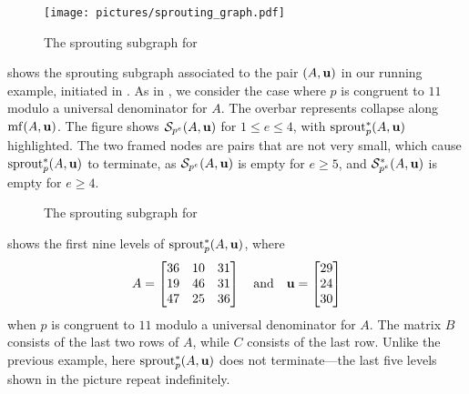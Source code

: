 \documentclass{amsart}
\begin{document}
\begin{example}
   \label{ex: ft.4}
   \begin{figure}
      \centering
      \texttt{[image: pictures/sprouting\_graph.pdf]}
      \caption{The sprouting subgraph for }
      \label{fig: sprouting graph}
   \end{figure}
    shows the sprouting subgraph associated to the pair $(A,\mathbf{u})$ in our running example, initiated in .
   As in , we consider the case where $p$ is congruent to $11$ modulo a universal denominator for $A$.
   The overbar represents collapse along $\operatorname{mf}(A,\mathbf{u})$.
   The figure shows $\mathcal{S}_{p^e}(A,\mathbf{u})$ for $1 \le e \le 4$, with $\operatorname{sprout}^*_p(A,\mathbf{u})$ highlighted.
   The two framed nodes are pairs that are not very small, which cause $\operatorname{sprout}^*_p(A,\mathbf{u})$ to terminate, as $\mathcal{S}_{p^e}(A,\mathbf{u})$ is empty for $e\ge 5$, and $\mathcal{S}_{p^e}^*(A,\mathbf{u})$ is empty for $e\ge 4$.
\end{example}

\begin{example}
   \label{ex: new example}
   \begin{figure}
      \centering
      \caption{The sprouting subgraph for }
      \label{fig: sprouting graph 2}
   \end{figure}
    shows the first nine levels of $\operatorname{sprout}^*_p(A,\mathbf{u})$, where
   \[
      A = \begin{bmatrix} 36&10&31 \\ 19&46&31 \\ 47&25&36 \end{bmatrix}
      \quad\text{and} \quad
      \mathbf{u} =\begin{bmatrix} 29 \\ 24 \\ 30 \end{bmatrix}
   \]
   when $p$ is congruent to $11$ modulo a universal denominator for $A$.
   The matrix $B$ consists of the last two rows of $A$, while $C$ consists of the last row.
   Unlike the previous example, here $\operatorname{sprout}^*_p(A,\mathbf{u})$ does not terminate---the last five levels shown in the picture repeat indefinitely.
\end{example}
\end{document}
